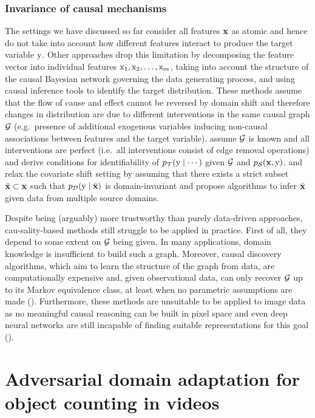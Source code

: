 \subsubsection{Invariance of causal mechanisms}
\label{sec:causal_da_sota}
The settings we have discussed so far consider all features ${\mathbf{x}}$ as atomic and hence do not take into account how different features interact to produce the target variable ${\textnormal{y}}$.  Other approaches drop this limitation by decomposing the feature vector into individual features ${\textnormal{x}}_1,{\textnormal{x}}_2,\dots,{\textnormal{x}}_m$, taking into account the structure of the causal Bayesian network governing the data generating process, and using causal inference tools to identify the target distribution. These methods assume that the flow of cause and effect cannot be reversed by domain shift and therefore changes in distribution are due to different interventions in the same causal graph ${\mathcal{G}}$ (e.g.\ presence of additional exogenous variables inducing non-causal associations between features and the target variable). \citet{Bareinboim2016} assume ${\mathcal{G}}$ is known and all interventions are perfect (i.e.\ all interventions consist of edge removal operations) and derive conditions for identifiability of $p_{\mathcal{T}}({\textnormal{y}} \mid \cdots)$ given ${\mathcal{G}}$ and $p_{\mathcal{S}}({\mathbf{x}}, {\textnormal{y}})$. \citet{Rojas2018} and \citet{Magliacane2018} relax the covariate shift setting by assuming that there exists a strict subset $\bar{{\mathbf{x}}} \subset {\mathbf{x}}$ such that $p_{\mathcal{D}}({\textnormal{y}} \mid \bar{{\mathbf{x}}})$ is domain-invariant and propose algorithms to infer $\bar{{\mathbf{x}}}$ given data from multiple source domains.

Despite being (arguably) more trustworthy than purely data-driven approaches, cau-\allowbreak sality-based methods still struggle to be applied in practice. First of all, they depend to some extent on ${\mathcal{G}}$ being given. In many applications, domain knowledge is insufficient to build such a graph. Moreover, causal discovery algorithms, which aim to learn the structure of the graph from data, are computationally expensive and, given observational data, can only recover ${\mathcal{G}}$ up to its Markov equivalence class, at least when no parametric assumptions are made  (\citet{Peters2014}). Furthermore, these methods are unsuitable to be applied to image data as no meaningful causal reasoning can be built in pixel space and even deep neural networks are still incapable of finding suitable representations for this goal (\citet{Scholkopf2021}).

\section{Adversarial domain adaptation for object counting in videos}
\label{sec:da_sensors}

